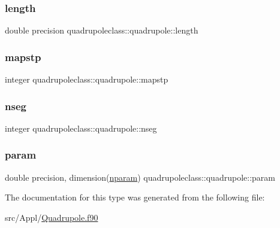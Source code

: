 \subsubsection{\texorpdfstring{length}{length}}
{\footnotesize\ttfamily double precision quadrupoleclass\+::quadrupole\+::length}

\mbox{\label{structquadrupoleclass_1_1quadrupole_a283a967adb1fb9dd7c742b5ce97ef3a0}} 
\subsubsection{\texorpdfstring{mapstp}{mapstp}}
{\footnotesize\ttfamily integer quadrupoleclass\+::quadrupole\+::mapstp}

\mbox{\label{structquadrupoleclass_1_1quadrupole_afece7d333f73554720932318f413f11b}} 
\subsubsection{\texorpdfstring{nseg}{nseg}}
{\footnotesize\ttfamily integer quadrupoleclass\+::quadrupole\+::nseg}

\mbox{\label{structquadrupoleclass_1_1quadrupole_ab9bcd11b6a6e1b6d7242eb243029393f}} 
\subsubsection{\texorpdfstring{param}{param}}
{\footnotesize\ttfamily double precision, dimension(\mbox{\hyperlink{namespacequadrupoleclass_a8eba81bd9796e431c21d0f46260b0c6c}{nparam}}) quadrupoleclass\+::quadrupole\+::param}



The documentation for this type was generated from the following file\+:\begin{DoxyCompactItemize}
\item 
src/\+Appl/\mbox{\hyperlink{_quadrupole_8f90}{Quadrupole.\+f90}}\end{DoxyCompactItemize}
